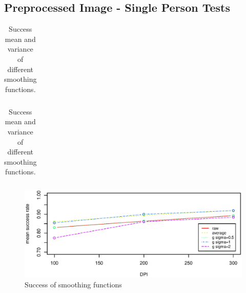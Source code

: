 
\subsection{Preprocessed Image - Single Person Tests}

\begin{table}[h]
\centering
    \begin{subtable}[b]{0.56\textwidth}
    \centering
        \begin{tabular}{lcccccc}
            
        \end{tabular}
        \caption{Mean success rate}
    \end{subtable}
    \begin{subtable}[b]{0.42\textwidth}
    \centering
        \begin{tabular}{lcccccc}
            
        \end{tabular}
        \caption{Variance in success rate}
    \end{subtable}
    \caption[Success of smoothing functions]{Success mean and variance of different smoothing functions.}
    \label{tb:smooth}
\end{table}

\begin{figure}[h]
\centering
\includegraphics[width=1\textwidth]{graphics/smoothing}
\caption{Success of smoothing functions}
\label{fig:smooth}
\end{figure}

